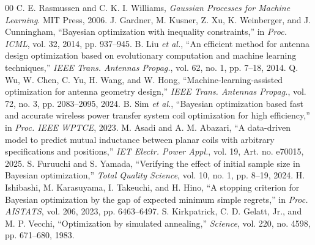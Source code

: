 \documentclass[10pt,conference,letterpaper]{IEEEtran}
\begin{document}
\begin{thebibliography}{00}
 C. E. Rasmussen and C. K. I. Williams, \emph{Gaussian Processes for Machine Learning}. MIT Press, 2006.
 J. Gardner, M. Kusner, Z. Xu, K. Weinberger, and J. Cunningham, ``Bayesian optimization with inequality constraints,'' in \emph{Proc. ICML}, vol. 32, 2014, pp. 937--945.
 B. Liu \emph{et al.}, ``An efficient method for antenna design optimization based on evolutionary computation and machine learning techniques,'' \emph{IEEE Trans. Antennas Propag.}, vol. 62, no. 1, pp. 7--18, 2014.
 Q. Wu, W. Chen, C. Yu, H. Wang, and W. Hong, ``Machine-learning-assisted optimization for antenna geometry design,'' \emph{IEEE Trans. Antennas Propag.}, vol. 72, no. 3, pp. 2083--2095, 2024.
 B. Sim \emph{et al.}, ``Bayesian optimization based fast and accurate wireless power transfer system coil optimization for high efficiency,'' in \emph{Proc. IEEE WPTCE}, 2023.
 M. Asadi and A. M. Abazari, ``A data-driven model to predict mutual inductance between planar coils with arbitrary specifications and positions,'' \emph{IET Electr. Power Appl.}, vol. 19, Art. no. e70015, 2025.
 S. Furuuchi and S. Yamada, ``Verifying the effect of initial sample size in Bayesian optimization,'' \emph{Total Quality Science}, vol. 10, no. 1, pp. 8--19, 2024.
 H. Ishibashi, M. Karasuyama, I. Takeuchi, and H. Hino, ``A stopping criterion for Bayesian optimization by the gap of expected minimum simple regrets,'' in \emph{Proc. AISTATS}, vol. 206, 2023, pp. 6463--6497.
 S. Kirkpatrick, C. D. Gelatt, Jr., and M. P. Vecchi, ``Optimization by simulated annealing,'' \emph{Science}, vol. 220, no. 4598, pp. 671--680, 1983.
\end{thebibliography}
\end{document}
